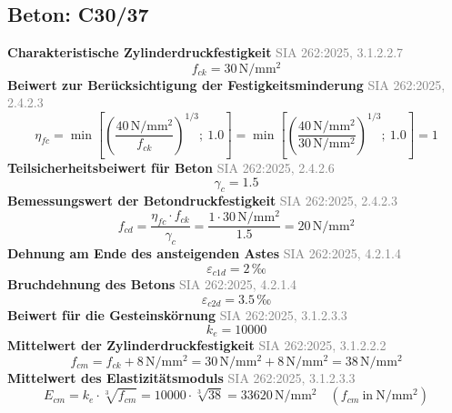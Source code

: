 \documentclass[11pt,a4paper]{article}
\newcommand{\normref}[1]{{\small\textcolor{gray}{#1}}}
\begin{document}
\subsection{Beton: C30/37}
\noindent\textbf{Charakteristische Zylinderdruckfestigkeit} \hfill \normref{SIA 262:2025, 3.1.2.2.7}
\begin{equation*}
f_{ck} = 30\,\mathrm{N}/\mathrm{mm}^{2}
\end{equation*}
\noindent\textbf{Beiwert zur Berücksichtigung der Festigkeitsminderung} \hfill \normref{SIA 262:2025, 2.4.2.3}
\begin{equation*}
\eta_{fc} = \min\left[\left(\frac{40\,\mathrm{N}/\mathrm{mm}^{2}}{f_{ck}}\right)^{1/3};\ 1.0\right] = \min\left[\left(\frac{40\,\mathrm{N}/\mathrm{mm}^{2}}{30\,\mathrm{N}/\mathrm{mm}^{2}}\right)^{1/3};\ 1.0\right] = 1
\end{equation*}
\noindent\textbf{Teilsicherheitsbeiwert für Beton} \hfill \normref{SIA 262:2025, 2.4.2.6}
\begin{equation*}
\gamma_c = 1.5
\end{equation*}
\noindent\textbf{Bemessungswert der Betondruckfestigkeit} \hfill \normref{SIA 262:2025, 2.4.2.3}
\begin{equation*}
f_{cd} = \frac{\eta_{fc} \cdot f_{ck}}{\gamma_c} = \frac{1 \cdot 30\,\mathrm{N}/\mathrm{mm}^{2}}{1.5} = 20\,\mathrm{N}/\mathrm{mm}^{2}
\end{equation*}
\noindent\textbf{Dehnung am Ende des ansteigenden Astes} \hfill \normref{SIA 262:2025, 4.2.1.4}
\begin{equation*}
\varepsilon_{c1d} = 2\,\text{‰}
\end{equation*}
\noindent\textbf{Bruchdehnung des Betons} \hfill \normref{SIA 262:2025, 4.2.1.4}
\begin{equation*}
\varepsilon_{c2d} = 3.5\,\text{‰}
\end{equation*}
\noindent\textbf{Beiwert für die Gesteinskörnung} \hfill \normref{SIA 262:2025, 3.1.2.3.3}
\begin{equation*}
k_e = 10000
\end{equation*}
\noindent\textbf{Mittelwert der Zylinderdruckfestigkeit} \hfill \normref{SIA 262:2025, 3.1.2.2.2}
\begin{equation*}
f_{cm} = f_{ck} + 8\,\mathrm{N}/\mathrm{mm}^{2} = 30\,\mathrm{N}/\mathrm{mm}^{2} + 8\,\mathrm{N}/\mathrm{mm}^{2} = 38\,\mathrm{N}/\mathrm{mm}^{2}
\end{equation*}
\noindent\textbf{Mittelwert des Elastizitätsmoduls} \hfill \normref{SIA 262:2025, 3.1.2.3.3}
\begin{equation*}
E_{cm} = k_e \cdot \sqrt[3]{f_{cm}} = 10000 \cdot \sqrt[3]{38} = 33620\,\mathrm{N}/\mathrm{mm}^{2} \quad \left(f_{cm}\ \text{in}\ \mathrm{N}/\mathrm{mm}^{2}\right)
\end{equation*}
\end{document}
